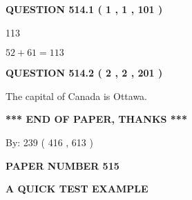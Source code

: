 \documentclass[12pt]{article}
\begin{document}
{\textbf{\Large{QUESTION
514.1 
 ( 1 , 1 , 101 )
}}}
  
  
 
 
\noindent{}

113
 
 
 
 
\noindent{}

$ %
52 +  %
61=   %
113$
 
 
  
\vspace{0.2in}
  
{\textbf{\Large{QUESTION
514.2 
 ( 2 , 2 , 201 )
}}}
  
  
 
 
\noindent{}
 
 
The capital of Canada is Ottawa.
 
 
 
 
   
   
 \vspace{0.2in}
 
   
   
   
   
\vspace{1.0in} 
{\textbf{\large{ *** END OF PAPER, THANKS *** }}} 
   
   
\hspace{1.0in} By: 
 239 ( 416 ,  613 )
   
   
   
   
\newpage 
\setcounter{page}{ 
   515001 } 
   
   
   
   
 {\textbf{ \Large{ PAPER NUMBER  515  }}}
   
   
\vspace{0.2in}
   
   
   
   
   
   
 \vspace{0.2in}
{\LARGE {\textbf{ A QUICK TEST EXAMPLE}}}
   
   
   
\vspace{0.2in}
   
\end{document}
